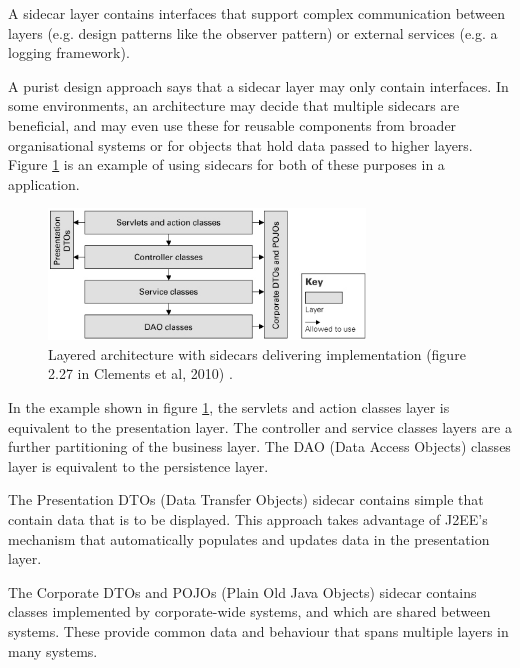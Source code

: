 \begin{definition}
    A sidecar layer contains interfaces that support complex communication between layers
    (e.g. design patterns like the observer pattern) or external services (e.g. a logging framework).
\end{definition}

A purist design approach says that a sidecar layer may only contain interfaces.
In some environments, an architecture may decide that multiple sidecars are beneficial,
and may even use these for reusable components from broader organisational systems
or for objects that hold data passed to higher layers.
Figure \ref{fig:sidecar2} is an example of using sidecars for both of these purposes in a
 application.

\begin{figure}[h]
  \begin{center}
    \includegraphics[width=0.75\textwidth]{images/layered_with_multiple_sidecars.png}
  \end{center}
  \caption{Layered architecture with sidecars delivering implementation (figure 2.27 in Clements et al, 2010) \cite{clements2010documenting}.}
  \label{fig:sidecar2}
\end{figure}

In the example shown in figure \ref{fig:sidecar2}, the servlets and action classes layer is equivalent to the presentation layer.
The controller and service classes layers are a further partitioning of the business layer.
The DAO (Data Access Objects) classes layer is equivalent to the persistence layer.

The Presentation DTOs (Data Transfer Objects) sidecar contains simple 
that contain data that is to be displayed.
This approach takes advantage of J2EE's mechanism that automatically populates and updates data in the presentation layer.

The Corporate DTOs and POJOs (Plain Old Java Objects) sidecar contains classes implemented by corporate-wide systems,
and which are shared between systems.
These provide common data and behaviour that spans multiple layers in many systems.


